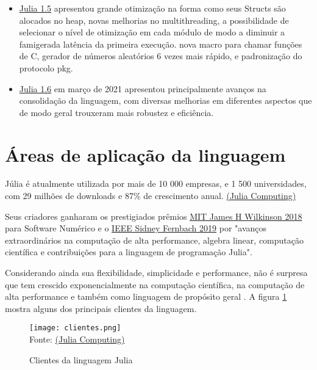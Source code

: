 \begin{itemize}
   \item\href{https://julialang.org/blog/2020/08/julia-1.5-highlights/}{Julia 1.5} apresentou grande otimização na forma como seus Structs são alocados no heap, novas melhorias no multithreading, a possibilidade de selecionar o nível de otimização em cada módulo de modo a diminuir a famigerada latência da primeira execução. nova macro para chamar funções de C, gerador de números aleatórios 6 vezes mais rápido, e padronização do protocolo pkg. 
   \item\href{https://julialang.org/blog/2021/03/julia-1.6-highlights/}{Julia 1.6} em março de 2021 apresentou principalmente avanços na consolidação da linguagem, com diversas melhorias em diferentes aspectos que de modo geral trouxeram mais robustez e eficiência. 
\end{itemize}


\section{Áreas de aplicação da linguagem}
Júlia é atualmente utilizada por mais de 10 000 empresas, e 1 500 universidades, com 29 milhões de downloads e 87\% de  crescimento anual. \href{https://web.archive.org/web/20211029112902/https://juliacomputing.com/}{(Julia Computing)}

Seus criadores ganharam os prestigiados prêmios \href{https://news.mit.edu/2018/julia-language-co-creators-win-james-wilkinson-prize-numerical-software-1226}{MIT James H Wilkinson 2018} para Software Numérico e o \href{[https://www.computer.org/press-room/2019-news/2019-ieee-fernbach-award-edelman](https://www.computer.org/press-room/2019-news/2019-ieee-fernbach-award-edelman)}{IEEE Sidney Fernbach 2019} por "avanços extraordinários na computação de alta performance, algebra linear, computação científica e contribuições para a linguagem de programação Julia". 

Considerando ainda sua flexibilidade, simplicidade e performance, não é surpresa que tem crescido exponencialmente na computação científica, na computação de alta performance e também como linguagem de propósito geral \cite{Klok2021}. A figura \ref{clientes} mostra alguns dos principais clientes da linguagem.
\begin{figure}[H]
   \begin{center}
       \caption{Clientes da linguagem Julia} \label{clientes}
       \texttt{[image: clientes.png]} \\
       {\tiny \sf Fonte: \href{https://web.archive.org/web/20211029112902/https://juliacomputing.com/}{(Julia Computing)}}
   \end{center}
  \end{figure}


